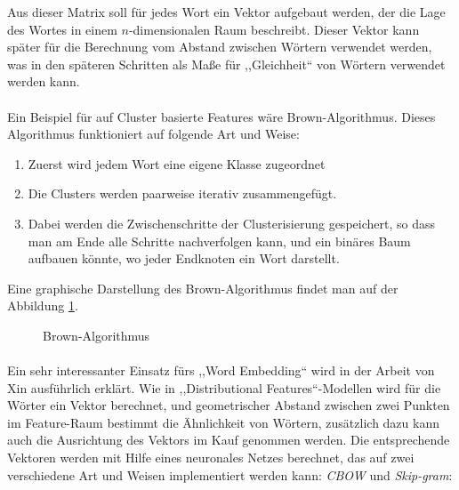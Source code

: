 Aus dieser Matrix soll für jedes Wort ein Vektor aufgebaut werden, der die Lage des Wortes in einem $n$-dimensionalen Raum beschreibt. Dieser Vektor kann später für die Berechnung vom Abstand zwischen Wörtern verwendet werden, was in den späteren Schritten als Maße für ,,Gleichheit`` von Wörtern verwendet werden kann.

\paragraph{}
Ein Beispiel für auf Cluster basierte Features wäre Brown-Algorithmus\cite{sun2011semi}. Dieses Algorithmus funktioniert auf folgende Art und Weise:
\begin{enumerate}
\item Zuerst wird jedem Wort eine eigene Klasse zugeordnet
\item Die Clusters werden paarweise iterativ zusammengefügt.
\item Dabei werden die Zwischenschritte der Clusterisierung gespeichert, so dass man am Ende alle Schritte nachverfolgen kann, und ein binäres Baum aufbauen könnte, wo jeder Endknoten ein Wort darstellt.  
\end{enumerate}

Eine graphische Darstellung des Brown-Algorithmus findet man auf der Abbildung \ref{fig:BROWN-CLUSTER}.

\begin{figure}[ht]
\vbox{\small}
\caption{Brown-Algorithmus}
\label{fig:BROWN-CLUSTER}
\end{figure}

\paragraph{}
Ein sehr interessanter Einsatz fürs ,,Word Embedding`` wird in der Arbeit von Xin\cite{rong2014word2vec} ausführlich erklärt. Wie in ,,Distributional Features``-Modellen wird für die Wörter ein Vektor berechnet, und geometrischer Abstand zwischen zwei Punkten im Feature-Raum bestimmt die Ähnlichkeit von Wörtern, zusätzlich dazu kann auch die Ausrichtung des Vektors im Kauf genommen werden. Die entsprechende Vektoren werden mit Hilfe eines neuronales Netzes berechnet, das auf zwei verschiedene Art und Weisen implementiert werden kann: \textit{CBOW} und \textit{Skip-gram}\cite{wang2014introduction}:

